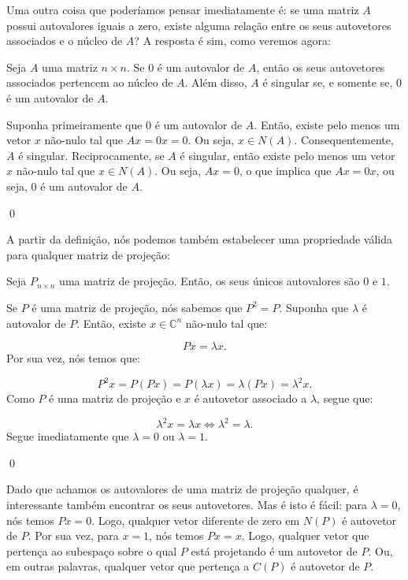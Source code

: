 Uma outra coisa que poderíamos pensar imediatamente é: se uma matriz $A$ possui autovalores iguais a zero, existe alguma relação entre os seus autovetores associados e o núcleo de $A$? A resposta é sim, como veremos agora:

\begin{Proposition}
	Seja $A$ uma matriz $n\times n$. Se $0$ é um autovalor de $A$, então os seus autovetores associados pertencem ao núcleo de $A$. Além disso, $A$ é singular se, e somente se, $0$ é um autovalor de $A$.
\end{Proposition}

\begin{Proof}
	Suponha primeiramente que $0$ é um autovalor de $A$. Então, existe pelo menos um vetor $x$ não-nulo tal que $Ax = 0x = 0$. Ou seja, $x\in N(A)$. Consequentemente, $A$ é singular. Reciprocamente, se $A$ é singular, então existe pelo menos um vetor $x$ não-nulo tal que $x\in N(A)$. Ou seja, $Ax = 0$, o que implica que $Ax = 0x$, ou seja, $0$ é um autovalor de $A$.
	
	\qed
\end{Proof}

A partir da definição, nós podemos também estabelecer uma propriedade válida para qualquer matriz de projeção:

\begin{Proposition}
	Seja $P_{n\times n}$ uma matriz de projeção. Então, os seus únicos autovalores são $0$ e $1$.
\end{Proposition}

\begin{Proof}
	Se $P$ é uma matriz de projeção, nós sabemos que $P^2 = P$. Suponha que $\lambda$ é autovalor de $P$. Então, existe $x\in\mathbb{C}^n$ não-nulo tal que:
	
	$$
	Px = \lambda x.
	$$
	Por sua vez, nós temos que:
	
	$$
	P^2x = P(Px) = P(\lambda x) = \lambda (Px) = \lambda^2 x.
	$$
	Como $P$ é uma matriz de projeção e $x$ é autovetor associado a $\lambda$, segue que:
	
	$$
	\lambda^2 x = \lambda x \iff \lambda^2 = \lambda.
	$$
	Segue imediatamente que $\lambda = 0$ ou $\lambda = 1$.
	
	\qed
\end{Proof}

Dado que achamos os autovalores de uma matriz de projeção qualquer, é interessante também encontrar os seus autovetores. Mas é isto é fácil: para $\lambda = 0$, nós temos $Px = 0$. Logo, qualquer vetor diferente de zero em $N(P)$ é autovetor de $P$. Por sua vez, para $x = 1$, nós temos $Px = x$. Logo, qualquer vetor que pertença ao subespaço sobre o qual $P$ está projetando é um autovetor de $P$. Ou, em outras palavras, qualquer vetor que pertença a $C(P)$ é autovetor de $P$.

